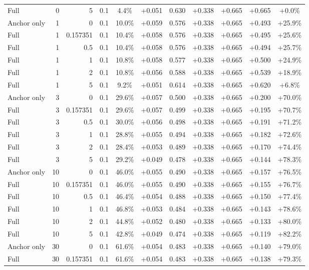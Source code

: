 \begin{table}[htbp]
\begin{tabular}{lrrrccccccc}
Full & 0 & 5 & 0.1 & 4.4\% & +0.051 & 0.630 & +0.338 & +0.665 & +0.665 & +0.0\% \\
Anchor only & 1 & 0 & 0.1 & 10.0\% & +0.059 & 0.576 & +0.338 & +0.665 & +0.493 & +25.9\% \\
Full & 1 & 0.157351 & 0.1 & 10.4\% & +0.058 & 0.576 & +0.338 & +0.665 & +0.495 & +25.6\% \\
Full & 1 & 0.5 & 0.1 & 10.4\% & +0.058 & 0.576 & +0.338 & +0.665 & +0.494 & +25.7\% \\
Full & 1 & 1 & 0.1 & 10.8\% & +0.058 & 0.577 & +0.338 & +0.665 & +0.500 & +24.9\% \\
Full & 1 & 2 & 0.1 & 10.8\% & +0.056 & 0.588 & +0.338 & +0.665 & +0.539 & +18.9\% \\
Full & 1 & 5 & 0.1 & 9.2\% & +0.051 & 0.614 & +0.338 & +0.665 & +0.620 & +6.8\% \\
Anchor only & 3 & 0 & 0.1 & 29.6\% & +0.057 & 0.500 & +0.338 & +0.665 & +0.200 & +70.0\% \\
Full & 3 & 0.157351 & 0.1 & 29.6\% & +0.057 & 0.499 & +0.338 & +0.665 & +0.195 & +70.7\% \\
Full & 3 & 0.5 & 0.1 & 30.0\% & +0.056 & 0.498 & +0.338 & +0.665 & +0.191 & +71.2\% \\
Full & 3 & 1 & 0.1 & 28.8\% & +0.055 & 0.494 & +0.338 & +0.665 & +0.182 & +72.6\% \\
Full & 3 & 2 & 0.1 & 28.4\% & +0.053 & 0.489 & +0.338 & +0.665 & +0.170 & +74.4\% \\
Full & 3 & 5 & 0.1 & 29.2\% & +0.049 & 0.478 & +0.338 & +0.665 & +0.144 & +78.3\% \\
Anchor only & 10 & 0 & 0.1 & 46.0\% & +0.055 & 0.490 & +0.338 & +0.665 & +0.157 & +76.5\% \\
Full & 10 & 0.157351 & 0.1 & 46.0\% & +0.055 & 0.490 & +0.338 & +0.665 & +0.155 & +76.7\% \\
Full & 10 & 0.5 & 0.1 & 46.4\% & +0.054 & 0.488 & +0.338 & +0.665 & +0.150 & +77.4\% \\
Full & 10 & 1 & 0.1 & 46.8\% & +0.053 & 0.484 & +0.338 & +0.665 & +0.143 & +78.6\% \\
Full & 10 & 2 & 0.1 & 44.8\% & +0.052 & 0.480 & +0.338 & +0.665 & +0.133 & +80.0\% \\
Full & 10 & 5 & 0.1 & 42.8\% & +0.049 & 0.474 & +0.338 & +0.665 & +0.119 & +82.2\% \\
Anchor only & 30 & 0 & 0.1 & 61.6\% & +0.054 & 0.483 & +0.338 & +0.665 & +0.140 & +79.0\% \\
Full & 30 & 0.157351 & 0.1 & 61.6\% & +0.054 & 0.483 & +0.338 & +0.665 & +0.138 & +79.3\% \\

\end{tabular}
\end{table}
